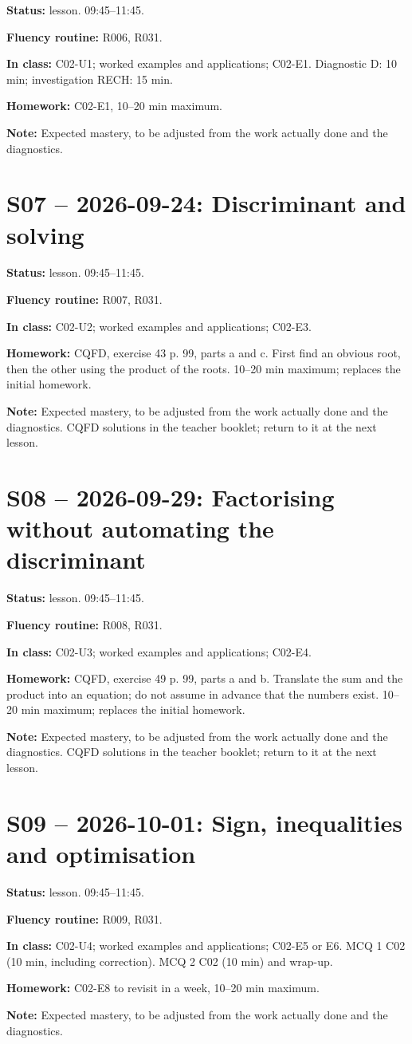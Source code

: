 \textbf{Status:} lesson. 09:45–11:45.\par\textbf{Fluency routine:} R006, R031.\par\textbf{In class:} C02-U1; worked examples and applications; C02-E1. Diagnostic D: 10 min; investigation RECH: 15 min.\par\textbf{Homework:} C02-E1, 10–20 min maximum.\par\textbf{Note:} Expected mastery, to be adjusted from the work actually done and the diagnostics.
\section*{S07 -- 2026-09-24: Discriminant and solving}
\textbf{Status:} lesson. 09:45–11:45.\par\textbf{Fluency routine:} R007, R031.\par\textbf{In class:} C02-U2; worked examples and applications; C02-E3. \par\textbf{Homework:} CQFD, exercise 43 p. 99, parts a and c. First find an obvious root, then the other using the product of the roots. 10–20 min maximum; replaces the initial homework.\par\textbf{Note:} Expected mastery, to be adjusted from the work actually done and the diagnostics. CQFD solutions in the teacher booklet; return to it at the next lesson.
\section*{S08 -- 2026-09-29: Factorising without automating the discriminant}
\textbf{Status:} lesson. 09:45–11:45.\par\textbf{Fluency routine:} R008, R031.\par\textbf{In class:} C02-U3; worked examples and applications; C02-E4. \par\textbf{Homework:} CQFD, exercise 49 p. 99, parts a and b. Translate the sum and the product into an equation; do not assume in advance that the numbers exist. 10–20 min maximum; replaces the initial homework.\par\textbf{Note:} Expected mastery, to be adjusted from the work actually done and the diagnostics. CQFD solutions in the teacher booklet; return to it at the next lesson.
\section*{S09 -- 2026-10-01: Sign, inequalities and optimisation}
\textbf{Status:} lesson. 09:45–11:45.\par\textbf{Fluency routine:} R009, R031.\par\textbf{In class:} C02-U4; worked examples and applications; C02-E5 or E6.  MCQ 1 C02 (10 min, including correction). MCQ 2 C02 (10 min) and wrap-up.\par\textbf{Homework:} C02-E8 to revisit in a week, 10–20 min maximum.\par\textbf{Note:} Expected mastery, to be adjusted from the work actually done and the diagnostics.
